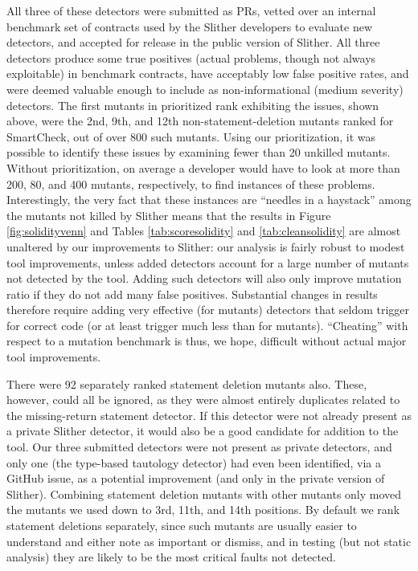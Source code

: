 All three of these detectors were submitted as PRs, vetted over an internal benchmark set of contracts used by the Slither developers to evaluate new detectors, and accepted for release in the public version of Slither.  All three detectors produce some true positives (actual problems, though not always exploitable) in benchmark contracts, have acceptably low false positive rates, and were deemed valuable enough to include as non-informational (medium severity) detectors.  The first mutants in prioritized rank exhibiting the issues, shown above, were the 2nd, 9th, and 12th non-statement-deletion mutants ranked for SmartCheck, out of over 800 such mutants.  Using our prioritization, it was possible to identify these issues by examining fewer than 20 unkilled mutants.  Without prioritization, on average a developer would have to look at more than 200, 80, and 400 mutants, respectively, to find instances of these problems.  Interestingly, the very fact that these instances are ``needles in a haystack'' among the mutants not killed by Slither means that the results in Figure \ref{fig:solidityvenn} and Tables \ref{tab:scoresolidity} and \ref{tab:cleansolidity} are almost unaltered by our improvements to Slither: our analysis is fairly robust to modest tool improvements, unless added detectors account for a large number of mutants not detected by the tool.  Adding such detectors will also only improve mutation ratio if they do not add many false positives.  Substantial changes in results therefore require adding very effective (for mutants) detectors that seldom trigger for correct code (or at least trigger much less than for mutants).  ``Cheating'' with respect to a mutation benchmark is thus, we hope, difficult without actual major tool improvements.

There were 92 separately ranked statement deletion mutants also.  These, however, could all be ignored, as they were almost entirely duplicates related to the missing-return statement detector.  If this detector were not already present as a private Slither detector, it would also be a good candidate for addition to the tool.  Our three submitted detectors were not present as private detectors, and only one (the type-based tautology detector) had even been identified, via a GitHub issue, as a potential improvement (and only in the private version of Slither).  Combining statement deletion mutants with other mutants only moved the mutants we used down to 3rd, 11th, and 14th positions.  By default we rank statement deletions separately, since such mutants are usually easier to understand and either note as important or dismiss, and in testing (but not static analysis) they are likely to be the most critical faults not detected.

